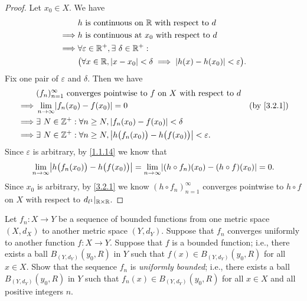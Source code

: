 \begin{proof}
  Let \(x_0 \in X\).
  We have
  \begin{align*}
             & h \text{ is continuous on } \mathbb{R} \text{ with respect to } d                                      \\
    \implies & h \text{ is continuous at } x_0 \text{ with respect to } d                                     \\
    \implies & \forall \varepsilon \in \mathbb{R}^+, \exists\ \delta \in \mathbb{R}^+ :                                       \\
             & \big(\forall x \in \mathbb{R}, \left\lvert x - x_0\right\rvert < \delta \implies \left\lvert h(x) - h(x_0)\right\rvert < \varepsilon\big).
  \end{align*}
  Fix one pair of \(\varepsilon\) and \(\delta\).
  Then we have
  \begin{align*}
             & (f_n)_{n = 1}^\infty \text{ converges pointwise to } f \text{ on } X \text{ with respect to } d                                 \\
    \implies & \lim_{n \to \infty} \abs{f_n(x_0) - f(x_0)} = 0                                                      & \text{(by \cref{3.2.1})} \\
    \implies & \exists\ N \in \Z^+ : \forall n \geq N, \abs{f_n(x_0) - f(x_0)} < \delta                                                        \\
    \implies & \exists\ N \in \Z^+ : \forall n \geq N, \abs{h\big(f_n(x_0)\big) - h\big(f(x_0)\big)} < \varepsilon.
  \end{align*}
  Since \(\varepsilon\) is arbitrary, by \cref{1.1.14} we know that
  \[
    \lim_{n \to \infty} \abs{h\big(f_n(x_0)\big) - h\big(f(x_0)\big)} = \lim_{n \to \infty} \abs{(h \circ f_n)(x_0) - (h \circ f)(x_0)} = 0.
  \]
  Since \(x_0\) is arbitrary, by \cref{3.2.1} we know \((h \circ f_n)_{n = 1}^\infty\) converges pointwise to \(h \circ f\) on \(X\) with respect to \(d_{l^1}|_{\mathbb{R} \times \mathbb{R}}\).
\end{proof}

\begin{ex}\label{ex:3.2.4}
  Let \(f_n : X \to Y\) be a sequence of bounded functions from one metric space \((X, d_X)\) to another metric space \((Y, d_Y)\).
  Suppose that \(f_n\) converges uniformly to another function \(f : X \to Y\).
  Suppose that \(f\) is a bounded function;
  i.e., there exists a ball \(B_{(Y, d_Y)}(y_0, R)\) in \(Y\) such that \(f(x) \in B_{(Y, d_Y)}(y_0, R)\) for all \(x \in X\).
  Show that the sequence \(f_n\) is \emph{uniformly bounded};
  i.e., there exists a ball \(B_{(Y, d_Y)}(y_0, R)\) in \(Y\) such that \(f_n(x) \in B_{(Y, d_Y)}(y_0, R)\) for all \(x \in X\) and all positive integers \(n\).
\end{ex}

